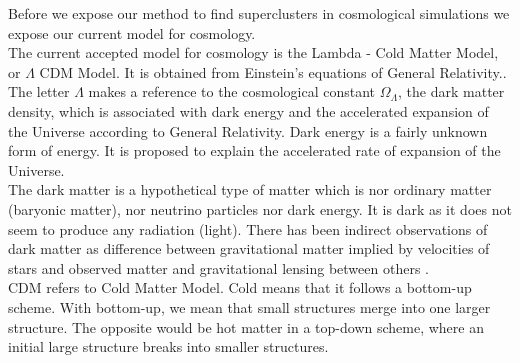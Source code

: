 \documentclass[12pt]{article}
\begin{document}
\begin{par}
Before we expose our method to find superclusters in cosmological simulations we expose our current model for cosmology.\\

The current accepted model for cosmology is the Lambda
 - Cold Matter Model, or $\Lambda$ CDM Model. It is obtained from Einstein's equations of General Relativity.\cite{bertone_particle_2005}.\\
The
  letter $\Lambda$ makes a reference to the
   cosmological constant $\Omega_{\Lambda}$, the dark
    matter density, which is
    associated with dark energy and the accelerated
     expansion of the Universe according to General
      Relativity. Dark energy is a fairly unknown form of
       energy. It is proposed to explain the accelerated
        rate of expansion of the Universe.
         \cite{peebles_cosmological_2003}\\
      
The dark matter is a hypothetical type of matter which is
 nor ordinary matter (baryonic matter), nor neutrino
  particles nor dark energy. It is dark as it does not
   seem to produce any radiation (light). There has been
    indirect observations of dark matter as difference
     between gravitational matter implied by velocities
      of stars and observed matter and gravitational
       lensing between others
        \cite{trimble_existence_1987}. \\
        
CDM refers to Cold Matter Model. Cold means that it
 follows a bottom-up scheme. With bottom-up, we mean that
  small structures merge into one larger structure. The
   opposite would be hot matter in a top-down scheme,
    where an initial large structure breaks into smaller
     structures. \cite{bertone_particle_2005} \\
      
\end{par}
\end{document}
